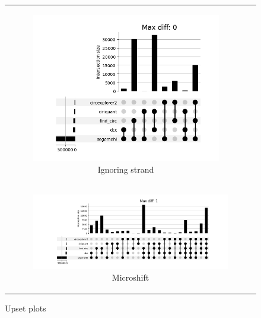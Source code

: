 \begin{figure}[ht]
\begin{tabular}{cc}
\begin{subfigure}{.5\textwidth}
            \includegraphics[width=.8\linewidth]{chapters/4_results_and_discussion/figures/detection/min_samples_0/upset/diff_0.png}
            \caption{Ignoring strand}
            \label{fig:detection_upset_nostrand}
        \end{subfigure} \\
        \multicolumn{2}{c}{
            \begin{subfigure}{\textwidth}
                \centering

                \includegraphics[width=.8\linewidth]{chapters/4_results_and_discussion/figures/detection/min_samples_0/upset/diff_1.png}
                \caption{Microshift}
                \label{fig:detection_upset_microshift}

            \end{subfigure}}
    \end{tabular}
    \caption{Upset plots} %
    \label{fig:detection_upset}
\end{figure}

